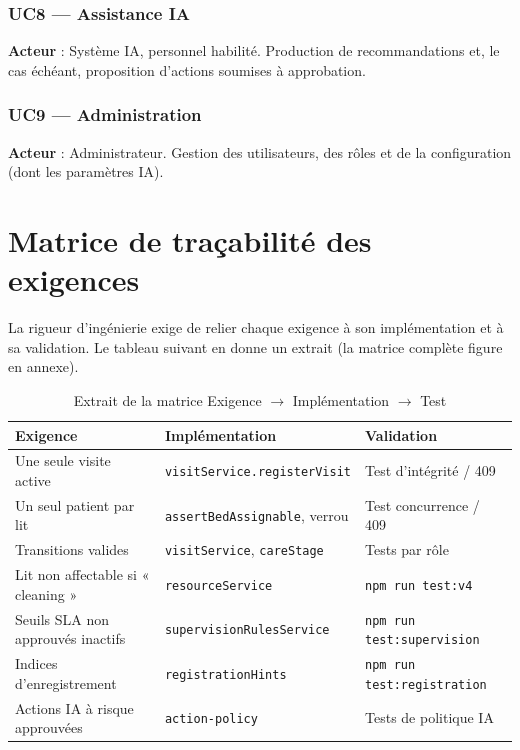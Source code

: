 \subsubsection{UC8 — Assistance IA}
\textbf{Acteur} : Système IA, personnel habilité. Production de recommandations et, le cas échéant, proposition d'actions soumises à approbation.

\subsubsection{UC9 — Administration}
\textbf{Acteur} : Administrateur. Gestion des utilisateurs, des rôles et de la configuration (dont les paramètres IA).

\section{Matrice de traçabilité des exigences}

La rigueur d'ingénierie exige de relier chaque exigence à son implémentation et à sa validation. Le tableau suivant en donne un extrait (la matrice complète figure en annexe).

\begin{table}[H]
\centering
\caption{Extrait de la matrice Exigence $\rightarrow$ Implémentation $\rightarrow$ Test}
\label{tab:matrice}
\small
\begin{tabular}{|l|l|l|}
\hline
\textbf{Exigence} & \textbf{Implémentation} & \textbf{Validation} \\
\hline
Une seule visite active & \texttt{visitService.registerVisit} & Test d'intégrité / 409 \\
\hline
Un seul patient par lit & \texttt{assertBedAssignable}, verrou & Test concurrence / 409 \\
\hline
Transitions valides & \texttt{visitService}, \texttt{careStage} & Tests par rôle \\
\hline
Lit non affectable si « cleaning » & \texttt{resourceService} & \texttt{npm run test:v4} \\
\hline
Seuils SLA non approuvés inactifs & \texttt{supervisionRulesService} & \texttt{npm run test:supervision} \\
\hline
Indices d'enregistrement & \texttt{registrationHints} & \texttt{npm run test:registration} \\
\hline
Actions IA à risque approuvées & \texttt{action-policy} & Tests de politique IA \\
\hline
\end{tabular}
\end{table}

